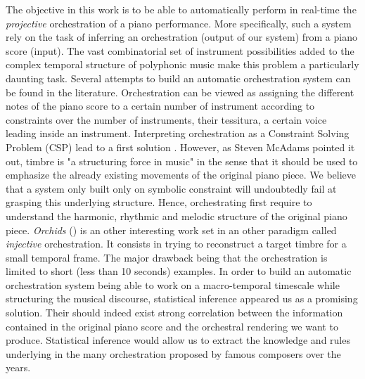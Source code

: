 \documentclass{article} %
\begin{document}
The objective in this work is to be able to automatically perform in real-time the \textit{projective} orchestration of a piano performance.
More specifically, such a system rely on the task of inferring an orchestration (output of our system) from a piano score (input).
The vast combinatorial set of instrument possibilities added to the complex temporal structure of polyphonic music make this problem a particularly daunting task. Several attempts to build an automatic orchestration system can be found in the literature. Orchestration can be viewed as assigning the different notes of the piano score to a certain number of instrument according to constraints over the number of instruments, their tessitura, a certain voice leading inside an instrument. Interpreting  orchestration as a Constraint Solving Problem (CSP) lead to a first solution \cite{Truchet2011Constraint-Prog}. However, as Steven McAdams pointed it out, timbre is "a structuring force in music" \cite{mcadams2013timbre} in the sense that it should be used to emphasize the already existing movements of the original piano piece. We believe that a system only built only on symbolic constraint will undoubtedly fail at grasping this underlying structure. Hence, orchestrating first require to understand the harmonic, rhythmic and melodic structure of the original piano piece.
\textit{Orchids} (\cite{Esling2010}) is an other interesting work set in an other paradigm called \textit{injective} orchestration. It consists in trying to reconstruct a target timbre for a small temporal frame. The major drawback being that the orchestration is limited to short (less than 10 seconds) examples.
In order to build an automatic orchestration system being able to work on a macro-temporal timescale while structuring the musical discourse, statistical inference appeared us as a promising solution. Their should indeed exist strong correlation between the information contained in the original piano score and the orchestral rendering we want to produce. Statistical inference would allow us to extract the knowledge and rules underlying in the many orchestration proposed by famous composers over the years.
\end{document}
